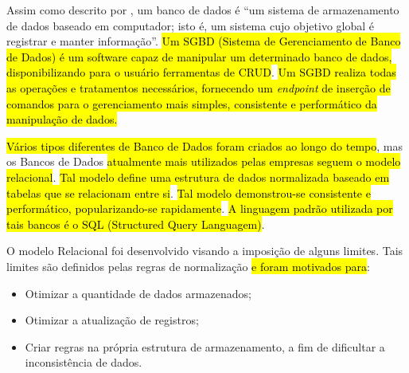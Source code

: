 Assim como descrito por \cite{date2004introduccao}, um banco de dados é ``um sistema de armazenamento de dados baseado em computador; isto é, um sistema cujo objetivo global é registrar e manter informação''. \hl{Um SGBD (Sistema de Gerenciamento de Banco de Dados) é um software capaz de manipular um determinado banco de dados, disponibilizando para o usuário ferramentas de CRUD}. \hl{Um SGBD realiza todas as operações e tratamentos necessários, fornecendo um \textit{endpoint} de inserção de comandos para o gerenciamento mais simples, consistente e performático da manipulação de dados.}




\hl{Vários tipos diferentes de Banco de Dados foram criados ao longo do tempo}, mas os Bancos de Dados \hl{atualmente mais utilizados pelas empresas seguem o modelo relacional}. \hl{Tal modelo define uma estrutura de dados normalizada baseado em tabelas que se relacionam entre si}. \hl{Tal modelo demonstrou-se consistente e performático, popularizando-se rapidamente}. \hl{A linguagem padrão utilizada por tais bancos é o SQL (Structured Query Languagem)}.






O modelo Relacional foi desenvolvido visando a imposição de alguns limites. Tais limites são definidos pelas regras de normalização \hl{e foram motivados para}:


\begin{itemize}
	\item Otimizar a quantidade de dados armazenados;
	\item Otimizar a atualização de registros;
	\item Criar regras na própria estrutura de armazenamento, a fim de dificultar a inconsistência de dados.
\end{itemize}

